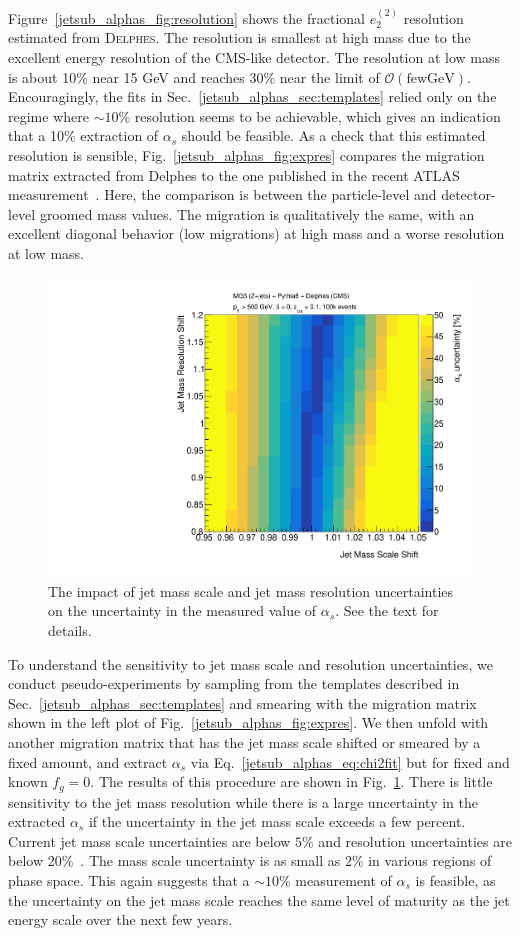 \documentclass[11pt]{cernrep}
\begin{document}
Figure~\ref{jetsub_alphas_fig:resolution} shows the fractional $e_2^{(2)}$ resolution estimated from \textsc{Delphes}.
%
The resolution is smallest at high mass due to the excellent energy resolution of the CMS-like detector.
%
The resolution at low mass is about 10\% near 15 GeV and reaches 30\% near the limit of $\mathcal{O}(\mathrm{few GeV})$.
%
Encouragingly, the fits in Sec.~\ref{jetsub_alphas_sec:templates} relied only on the regime where $\sim 10\%$ resolution seems to be achievable, which gives an indication that a 10\% extraction of $\alpha_s$ should be feasible.
%
As a check that this estimated resolution is sensible, Fig.~\ref{jetsub_alphas_fig:expres} compares the migration matrix extracted from Delphes to the one published in the recent ATLAS measurement~\cite{Aaboud:2017qwh}.
%
Here, the comparison is between the particle-level and detector-level groomed mass values. 
%
The migration is qualitatively the same, with an excellent diagonal behavior (low migrations) at high mass and a worse resolution at low mass.

\begin{figure}[t]
\begin{center}
\includegraphics[width = 0.5\columnwidth]{jetsub_alphas_resolution_scan.pdf}
\end{center}
\caption{The impact of jet mass scale and jet mass resolution uncertainties on the uncertainty in the measured value of $\alpha_s$.  See the text for details.}
\label{jetsub_alphas_fig:expfit}
\end{figure}

To understand the sensitivity to jet mass scale and resolution uncertainties, we conduct pseudo-experiments by sampling from the templates described in Sec.~\ref{jetsub_alphas_sec:templates} and smearing with the migration matrix shown in the left plot of Fig.~\ref{jetsub_alphas_fig:expres}.
%
We then unfold with another migration matrix that has the jet mass scale shifted or smeared by a fixed amount, and extract $\alpha_s$ via Eq.~\eqref{jetsub_alphas_eq:chi2fit} but for fixed and known $f_g=0$.
%
The results of this procedure are shown in Fig.~\ref{jetsub_alphas_fig:expfit}.
%
There is little sensitivity to the jet mass resolution while there is a large uncertainty in the extracted $\alpha_s$ if the uncertainty in the jet mass scale exceeds a few percent.
%
Current jet mass scale uncertainties are below $5\%$ and resolution uncertainties are below 20\%~\cite{ATLAS-CONF-2017-063,CMS-PAS-JME-16-003}.
%
The mass scale uncertainty is as small as $2\%$ in various regions of phase space.
%
This again suggests that a $\sim 10\%$ measurement of $\alpha_s$ is feasible, as the uncertainty on the jet mass scale reaches the same level of maturity as the jet energy scale over the next few years.
\end{document}
